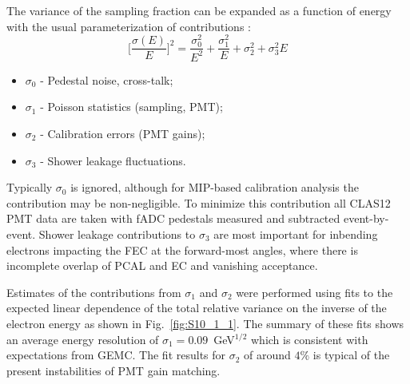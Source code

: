 The variance of the sampling fraction can be expanded as a function of energy with the usual parameterization of contributions \cite{ps1981}:
\begin{equation}
\biggl[\frac{\sigma(E)}{E}\biggr]^2 = \frac{\sigma^2_0}{E^2} + \frac{\sigma^2_1}{E} +\sigma^2_2 + \sigma^2_3 E 
\label{eq:sferror}
\end{equation}

\begin{itemize}
\item $\sigma_0$ - Pedestal noise, cross-talk;
\item $\sigma_1$ - Poisson statistics (sampling, PMT);
\item $\sigma_2$ - Calibration errors (PMT gains);
\item $\sigma_3$ - Shower leakage fluctuations.
\end{itemize}

Typically $\sigma_0$ is ignored, although for MIP-based calibration analysis the contribution may be non-negligible.  To minimize this contribution all CLAS12 PMT data are taken with fADC pedestals measured and subtracted event-by-event.  Shower leakage contributions to $\sigma_3$ are most important for inbending electrons impacting the FEC at the forward-most angles, where there is incomplete overlap of PCAL and EC and vanishing acceptance.  

Estimates of the contributions from $\sigma_1$ and $\sigma_2$ were performed using fits to the expected linear dependence of the total relative variance on the inverse of the electron energy as shown in Fig.~\ref{fig:S10_1_1}.  The summary of these fits shows an average energy resolution of $\sigma_1 = 0.09$~GeV$^{1/2}$ which is consistent with expectations from GEMC.   The fit results for $\sigma_2$ of around $4\%$ is typical of the present instabilities of PMT gain matching.
 
